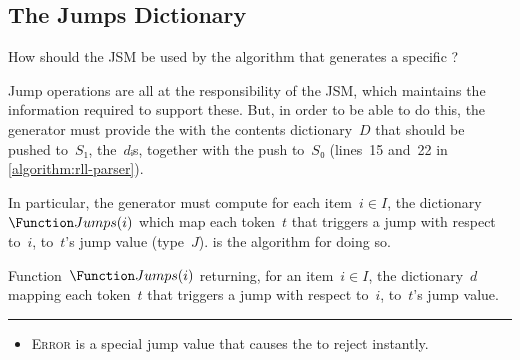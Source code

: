 \subsection{The Jumps Dictionary}
How should the JSM be used by the algorithm that generates a specific \RLLp?

Jump operations are all at the responsibility of the JSM, which maintains the
information required to support these. But, in order to be able to do this,
the generator must provide the \RLLp with the contents dictionary~$D$ that
should be pushed to~$S₁$, the~$dᵢ$s, together with the push to~$S₀$ (lines~15
and~22 in \cref{algorithm:rll-parser}).

In particular, the \RLLp generator must compute for each
item~$i∈I$, the dictionary~$\Function Jumps(i)$ which
map each token~$t$ that triggers a jump with
respect to~$i$, to~$t$'s jump value (type~$J$).
 is the algorithm for doing so.

\begin{algorithm}
  \begin{algorithmic}
  \caption{\label{algorithm:coordination}
    Function~$\Function Jumps(i)$ returning, for an item~$i∈I$,
  the dictionary~$d$ mapping each token~$t$ that
    triggers a jump with respect to~$i$, to~$t$'s jump value.
  }
   
   
      \BREAK
    \FI
         
         
      \FI
    \ENDFOR %
  \ENDFOR %
      \FI
    \ENDFOR %
  \FI
  \end{algorithmic}
  \vspace{0.3ex}
  \hrule
  \vspace{0.3ex}
  \begin{itemize}
    \item \textsc{Error} is a special jump value that causes the \RLLp to reject instantly.
  \end{itemize}
   
\end{algorithm}

